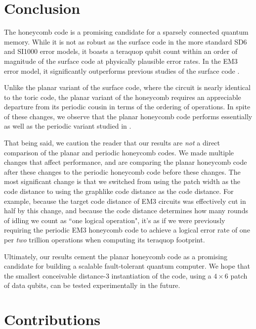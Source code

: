 \documentclass[onecolumn,unpublished,a4paper]{quantumarticle}
\theoremstyle{definition}
\theoremstyle{definition}
\theoremstyle{definition}
\begin{document}
\section{Conclusion}
\label{sec:conclusion}

The honeycomb code is a promising candidate for a sparsely connected quantum memory.  
While it is not as robust as the surface code in the more standard SD6 and SI1000 error models, it boasts a teraquop qubit count within an order of magnitude of the surface code at physically plausible error rates.  
In the EM3 error model, it significantly outperforms previous studies of the surface code \cite{chao2020optimization}.

Unlike the planar variant of the surface code, where the circuit is nearly identical to the toric code, the planar variant of the honeycomb requires an appreciable departure from its periodic cousin in terms of the ordering of operations.
In spite of these changes, we observe that the planar honeycomb code performs essentially as well as the periodic variant studied in \cite{gidney2021honeycombmemory}.

That being said, we caution the reader that our results are \emph{not} a direct comparison of the planar and periodic honeycomb codes.
We made multiple changes that affect performance, and are comparing the planar honeycomb code after these changes to the periodic honeycomb code before these changes.
The most significant change is that we switched from using the patch width as the code distance to using the graphlike code distance as the code distance.
For example, because the target code distance of EM3 circuits was effectively cut in half by this change, and because the code distance determines how many rounds of idling we count as ``one logical operation", it's as if we were previously requiring the periodic EM3 honeycomb code to achieve a logical error rate of one per \emph{two} trillion operations when computing its teraquop footprint.

Ultimately, our results cement the planar honeycomb code as a promising candidate for building a scalable fault-tolerant quantum computer.
We hope that the smallest conceivable distance-3 instantiation of the code, using a $4\times6$ patch of data qubits, can be tested experimentally in the future.

\section{Contributions}
\end{document}
